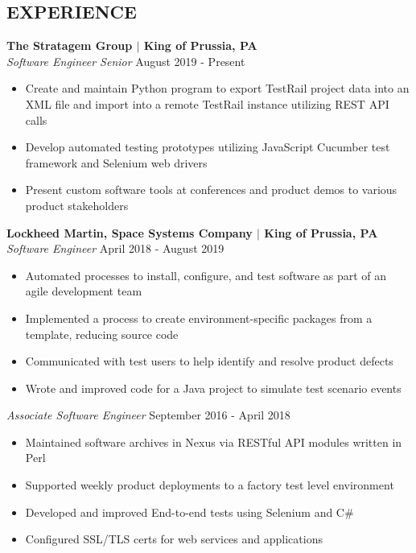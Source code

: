 \documentclass[line,resmargin,11pt]{res}
\begin{document}
\begin{resume}
\section{EXPERIENCE}
                \textbf{The Stratagem Group $|$ King of Prussia, PA} \\
                {\sl Software Engineer Senior} \hfill August 2019 - Present
                \begin{itemize} \itemsep -2pt %
                \item Create and maintain Python program to export TestRail project data into an XML file and import into a remote TestRail instance utilizing REST API calls
                \item Develop automated testing prototypes utilizing JavaScript Cucumber test framework and Selenium web drivers
                \item Present custom software tools at conferences and product demos to various product stakeholders
                \end{itemize}

                \textbf{Lockheed Martin, Space Systems Company $|$ King of Prussia, PA} \\
               {\sl Software Engineer} \hfill April 2018 - August 2019 
                \begin{itemize}  \itemsep -2pt %
   				\item Automated processes to install, configure, and test software as part of an agile development team
               \item Implemented a process to create environment-specific packages from a template, reducing source code
 				\item Communicated with test users to help identify and resolve product defects
               \item Wrote and improved code for a Java project to simulate test scenario events
				\end{itemize}
	
				{\sl Associate Software Engineer} \hfill September 2016 - April 2018
                \begin{itemize}  \itemsep -2pt %
				\item Maintained software archives in Nexus via RESTful API modules written in Perl
               \item Supported weekly product deployments to a factory test level environment
               \item Developed and improved End-to-end tests using Selenium and C\#
               \item Configured SSL/TLS certs for web services and applications
                \end{itemize}
                

\end{resume}
\end{document}
